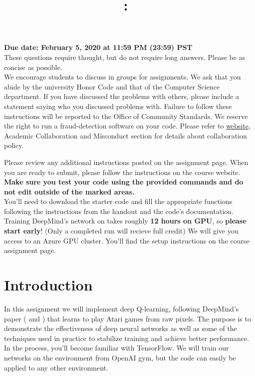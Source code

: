 \documentclass{article}
\title{
\vspace{-1in}
\textmd{\textbf{\hmwkClass:\ \hmwkTitle}}}
\author{}
\date{} %
\begin{document}
\maketitle
\vspace{-.5in}
\begin{framed}
{\bf Due date: February 5, 2020 at 11:59 PM (23:59) PST}
\\[1em]
These questions require thought, but do not require long answers. Please be as concise as possible.
\\[1em]
We encourage students to discuss in groups for assignments. We ask
that you abide by the university Honor Code and that of the Computer Science department. If you have discussed the problems with others,
please include a statement saying who you discussed problems with. Failure to follow these instructions
will be reported to the Office of Community Standards. We reserve the right to run a fraud-detection software on your code. Please refer to \href{http://web.stanford.edu/class/cs234/index.html}{website}, Academic Collaboration and Misconduct section for details about collaboration policy.

Please review any additional instructions posted on the assignment page. When you are ready to submit, please
follow the instructions on the course website. \textbf{Make sure you test your code using the
provided commands and do not edit outside of the marked areas.}
\\[1em]
You'll need to download the starter code and fill the appropriate functions following the instructions from the handout and the code's documentation. Training DeepMind's network on  takes roughly \textbf{12 hours on GPU}, so \textbf{please start early}! (Only a completed run will recieve full credit) We will give you access to an Azure GPU cluster. You'll find the setup instructions on the course assignment page.
\end{framed}
\section*{Introduction}

In this assignment we will implement deep Q-learning, following DeepMind's paper (\cite{mnih2015human} and \cite{mnih-atari-2013}) that learns to play Atari games from raw pixels. The purpose is to demonstrate the effectiveness of deep neural networks as well as some of the techniques used in practice to stabilize training and achieve better performance. In the process, you'll become familiar with TensorFlow. We will train our networks on the  environment from OpenAI gym, but the code can easily be applied to any other environment. \\
\end{document}
